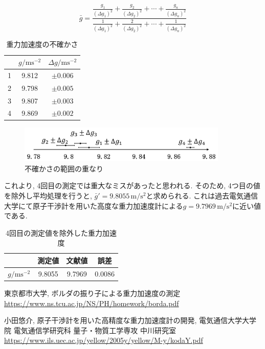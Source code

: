 \documentclass{jarticle}
\begin{document}
\begin{equation}
  \bar{g}=\frac{
    \frac{g_1}{(\Delta g_1)^2} + \frac{g_2}{(\Delta g_2)^2}+\cdots+\frac{g_n}{(\Delta g_n)^2}
  }{
    \frac{1}{(\Delta g_1)^2} + \frac{2}{(\Delta g_2)^2}+\cdots+\frac{1}{(\Delta g_n)^2}
  }
\end{equation}

\begin{table}[H]
  \centering
  \caption{重力加速度の不確かさ}
  \begin{tabular}{ccc}
    \hline
    & $g/\mathrm{ms^{-2}}$ & $\Delta g/\mathrm{ms^{-2}}$ \\
    \hline
    1 & 9.812 & $\pm 0.006$ \\
    2 & 9.798 & $\pm 0.005$ \\
    3 & 9.807 & $\pm 0.003$ \\
    4 & 9.869 & $\pm 0.002$ \\
    \hline
  \end{tabular}
\end{table}

\begin{figure}[H]
  \begin{center}
  \includegraphics[width=100mm]{uncertainty_graph.png}
  \caption{不確かさの範囲の重なり}
  \end{center}
\end{figure}

これより, 4回目の測定では重大なミスがあったと思われる.
そのため, 4つ目の値を除外し平均処理を行うと, $\bar{g}'=9.8055\,\mathrm{m/s^2}$と求められる.
これは過去電気通信大学にて原子干渉計を用いた高度な重力加速度計による$g=9.7969\,\mathrm{m/s^2}$に近い値である.\cite{uec-atom}

\begin{table}[h]
  \centering
  \caption{4回目の測定値を除外した重力加速度}
  \begin{tabular}{cccc}
    \hline
    & 測定値 & 文献値\cite{uec-atom} & 誤差 \\
    \hline
    $g/\mathrm{ms^{-2}}$ & 9.8055 & 9.7969 & 0.0086 \\
    \hline
  \end{tabular}
\end{table}

\begin{thebibliography}{99}

  東京都市大学, ボルダの振り子による重力加速度の測定 \url{https://www.ns.tcu.ac.jp/NS/PH/homework/borda.pdf}

  小田悠介, 原子干渉計を用いた高精度な重力加速度計の開発, 電気通信大学大学院 電気通信学研究科 量子・物質工学専攻 中川研究室 \url{https://www.ils.uec.ac.jp/yellow/2005y/yellow/M-y/kodaY.pdf}

\end{thebibliography}
\end{document}
